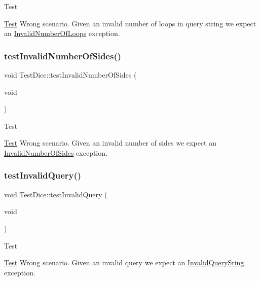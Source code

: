 \begin{DoxyRefDesc}{Test}
\item[\hyperlink{test__test000011}{Test}]Wrong scenario. Given an invalid number of loops in query string we expect an \hyperlink{struct_invalid_number_of_loops}{Invalid\+Number\+Of\+Loops} exception. \end{DoxyRefDesc}
\hypertarget{class_test_dice_a375bfdde3e13caf2116f3ca25fd7af4c}{}\label{class_test_dice_a375bfdde3e13caf2116f3ca25fd7af4c} 
\subsubsection{\texorpdfstring{test\+Invalid\+Number\+Of\+Sides()}{testInvalidNumberOfSides()}}
{\footnotesize\ttfamily void Test\+Dice\+::test\+Invalid\+Number\+Of\+Sides (\begin{DoxyParamCaption}\item[{void}]{ }\end{DoxyParamCaption})\hspace{0.3cm}{\ttfamily [protected]}}

\begin{DoxyRefDesc}{Test}
\item[\hyperlink{test__test000012}{Test}]Wrong scenario. Given an invalid number of sides we expect an \hyperlink{struct_invalid_number_of_sides}{Invalid\+Number\+Of\+Sides} exception. \end{DoxyRefDesc}
\hypertarget{class_test_dice_ac550d1791d8723fb56ec25f59d5dfa51}{}\label{class_test_dice_ac550d1791d8723fb56ec25f59d5dfa51} 
\subsubsection{\texorpdfstring{test\+Invalid\+Query()}{testInvalidQuery()}}
{\footnotesize\ttfamily void Test\+Dice\+::test\+Invalid\+Query (\begin{DoxyParamCaption}\item[{void}]{ }\end{DoxyParamCaption})\hspace{0.3cm}{\ttfamily [protected]}}

\begin{DoxyRefDesc}{Test}
\item[\hyperlink{test__test000009}{Test}]Wrong scenario. Given an invalid query we expect an \hyperlink{struct_invalid_query_sring}{Invalid\+Query\+Sring} exception. \end{DoxyRefDesc}
\hypertarget{class_test_dice_a4bc687597fc6bcf0d7bbc184c9250c56}{}\label{class_test_dice_a4bc687597fc6bcf0d7bbc184c9250c56} 
